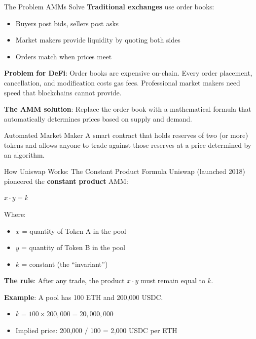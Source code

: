 \documentclass[10pt]{beamer}
\newcommand{\highlight}[1]{\textcolor{AccentOrange}{\textbf{#1}}}
\begin{document}
\begin{frame}{The Problem AMMs Solve}
  \textbf{Traditional exchanges} use order books:
  \begin{itemize}
    \item Buyers post bids, sellers post asks
    \item Market makers provide liquidity by quoting both sides
    \item Orders match when prices meet
  \end{itemize}
  
  \vspace{0.5em}
  \textbf{Problem for DeFi}: Order books are expensive on-chain. Every order placement, cancellation, and modification costs gas fees. Professional market makers need speed that blockchains cannot provide.
  
  \vspace{1em}
  \textbf{The AMM solution}: Replace the order book with a mathematical formula that automatically determines prices based on supply and demand.
  
  \vspace{0.5em}
  \begin{block}{Automated Market Maker}
    A smart contract that holds reserves of two (or more) tokens and allows anyone to trade against those reserves at a price determined by an algorithm.
  \end{block}
\end{frame}

\begin{frame}{How Uniswap Works: The Constant Product Formula}
  Uniswap (launched 2018) pioneered the \highlight{constant product} AMM:
  
  \vspace{0.5em}
  \begin{center}
    \Large $x \cdot y = k$
  \end{center}
  
  Where:
  \begin{itemize}
    \item $x$ = quantity of Token A in the pool
    \item $y$ = quantity of Token B in the pool
    \item $k$ = constant (the ``invariant'')
  \end{itemize}
  
  \vspace{1em}
  \textbf{The rule}: After any trade, the product $x \cdot y$ must remain equal to $k$.
  
  \vspace{1em}
  \textbf{Example}: A pool has 100 ETH and 200,000 USDC.
  \begin{itemize}
    \item $k = 100 \times 200{,}000 = 20{,}000{,}000$
    \item Implied price: 200,000 / 100 = 2,000 USDC per ETH
  \end{itemize}
\end{frame}
\end{document}
